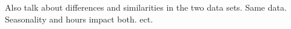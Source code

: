 
Also talk about differences and similarities in the two data sets. Same data. Seasonality and hours impact both. ect.